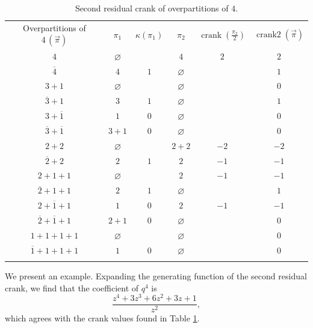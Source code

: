\documentclass[pdftex]{sigma}
\numberwithin{equation}{section}
\begin{document}
\begin{table}[hbt!]\centering
\caption{Second residual crank of overpartitions of $4$.}\label{t3}
\vspace{2mm}
\begin{tabular}{ c c c c c c }
Overpartitions of $4\,(\vec{\pi})$ & $\pi_1$ & $\kappa(\pi_1)$ & $\pi_2$ & $\operatorname{crank}(\frac{\pi_2}{2})$ & $\operatorname{crank2}(\vec{\pi})$ \\
 $4$                          & $\varnothing$ &     & $4$    & $2$ & $2$\\
 $\overline{4}$               & $4$    & $1$ & $\varnothing$ &     & $1$\\
 $3+1$                        & $\varnothing$ &     & $\varnothing$ &     & $0$\\
 $\overline{3}+1$             & $3$    & $1$ & $\varnothing$ &     & $1$\\
 $3+\overline{1}$             & $1$    & $0$ & $\varnothing$ &     & $0$\\
 $\overline{3}+\overline{1}$  & $3+1$  & $0$ & $\varnothing$ &     & $0$\\
 $2+2$                        & $\varnothing$ &     & $2+2$  & $-2$& \hspace{-3mm}$-2$\\
 $\overline{2}+2$             & $2$    & $1$ & $2$    & $-1$& \hspace{-3mm}$-1$\\
 $2+1+1$                      & $\varnothing$ &     & $2$    & $-1$& \hspace{-3mm}$-1$\\
 $\overline{2}+1+1$           & $2$    & $1$ & $\varnothing$ &     & $1$\\
 $2+\overline{1}+1$           & $1$    & $0$ & $2$    & $-1$& \hspace{-3mm}$-1$\\
 $\overline{2}+\overline{1}+1$& $2+1$  & $0$ & $\varnothing$ &     & $0$\\
 $1+1+1+1$                    & $\varnothing$ &     & $\varnothing$ &     & $0$\\
 $\overline{1}+1+1+1$         & $1$    & $0$ & $\varnothing$ &     & $0$\\\\
\end{tabular}
\end{table}

We present an example.
Expanding the generating function of the second residual crank, we find that the coefficient of $q^4$ is
\begin{equation*}%
\frac{z^4+3z^3+6z^2+3z+1}{z^2},
\end{equation*}
which agrees with the crank values found in Table \ref{t3}.
\end{document}
